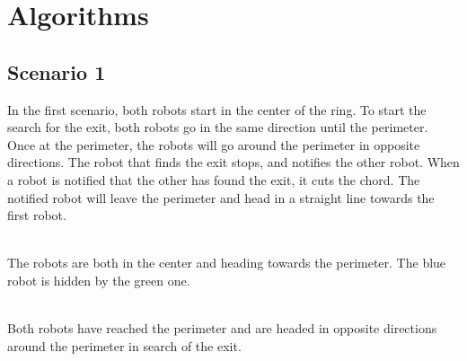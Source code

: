 \documentclass[12pt,letterpaper]{article}
\begin{document}
    \section{Algorithms}
    \subsection{Scenario 1}
        In the first scenario, both robots start in the center of the ring. To start the search for the exit, both robots go in the same direction until the perimeter. Once at the perimeter, the robots will go around the perimeter in opposite directions. The robot that finds the exit stops, and notifies the other robot. When a robot is notified that the other has found the exit, it cuts the chord. The notified robot will leave the perimeter and head in a straight line towards the first robot.
        
        \begin{center}
             \\
            The robots are both in the center and heading towards the perimeter. The blue robot is hidden by the green one.
        \end{center}
        
        
        \begin{center}
             \\
            Both robots have reached the perimeter and are headed in opposite directions around the perimeter in search of the exit.
        \end{center}
        
\end{document}
